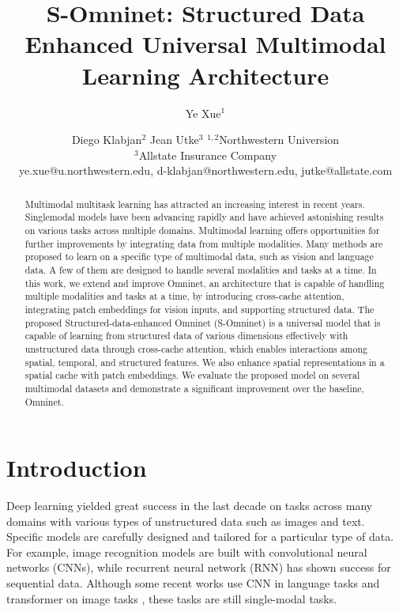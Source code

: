 \documentclass{article}
\title{S-Omninet: Structured Data Enhanced Universal Multimodal Learning Architecture}
\author{
Ye Xue$^1$
\and
Diego Klabjan$^2$\And
Jean Utke$^{3}$%
\affiliations
$^{1,2}$Northwestern Universion\\
$^3$Allstate Insurance Company\\
\emails
ye.xue@u.northwestern.edu,
d-klabjan@northwestern.edu,
jutke@allstate.com %
}
\begin{document}
\maketitle

\begin{abstract}
Multimodal multitask learning has attracted an increasing interest in recent years. Singlemodal models have been advancing rapidly and have achieved astonishing results on various tasks across multiple domains. Multimodal learning offers opportunities for further improvements by integrating data from multiple modalities. Many methods are proposed to learn on a specific type of multimodal data, such as vision and language data. A few of them are designed to handle several modalities and tasks at a time. In this work, we extend and improve Omninet, an architecture that is capable of handling multiple modalities and tasks at a time, by introducing cross-cache attention, integrating patch embeddings for vision inputs, and supporting structured data. The proposed Structured-data-enhanced Omninet (S-Omninet) is a universal model that is capable of learning from structured data of various dimensions effectively with unstructured data through cross-cache attention, which enables interactions among spatial, temporal, and structured features. We also enhance spatial representations in a spatial cache with patch embeddings. We evaluate the proposed model on several multimodal datasets and demonstrate a significant improvement over the baseline, Omninet. 
\end{abstract}

\section{Introduction}\label{intro}


Deep learning yielded great success in the last decade on tasks across many domains with various types of unstructured data such as images and text. Specific models are carefully designed and tailored for a particular type of data. For example, image recognition models \cite{he2016deep} are built with convolutional neural networks (CNNs), while recurrent neural network (RNN) has shown success for sequential data. Although some recent works use CNN in language tasks and transformer on image tasks \cite{dosovitskiy2020image}, these tasks are still single-modal tasks. 
\end{document}
